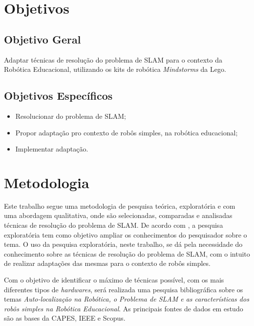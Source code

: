 	\section{Objetivos}

	\subsection{Objetivo Geral} %
	\label{sub:objetivos_gerais}
	
		Adaptar técnicas de resolução do problema de SLAM para o contexto da Robótica Educacional, utilizando os kits de robótica \textit{Mindstorms} da Lego.


	\subsection{Objetivos Específicos} %
	\label{sub:objetivos_específicos}
		 
	\begin{itemize}
		\item Resolucionar do problema de SLAM;
		\item Propor adaptação pro contexto de robôs simples, na robótica educacional;
		\item Implementar adaptação.
	\end{itemize}
	

	\section[Metodologia]{Metodologia}

Este trabalho segue uma metodologia de pesquisa teórica, exploratória e com uma abordagem qualitativa, onde são selecionadas, comparadas e analisadas técnicas de resolução do problema de SLAM. De acordo com \cite{metodologiaCientifica}, a pesquisa exploratória tem como objetivo ampliar os conhecimentos do pesquisador sobre o tema. O uso da pesquisa exploratória, neste trabalho, se dá pela necessidade do conhecimento sobre as técnicas de resolução do problema de SLAM, com o intuito de realizar adaptações das mesmas para o contexto de robôs simples.

Com o objetivo de identificar o máximo de técnicas possível, com os mais diferentes tipos de \textit{hardwares}, será realizada uma pesquisa bibliográfica sobre os temas \textit{Auto-localização na Robótica, o Problema de SLAM e as características dos robôs simples na Robótica Educacional}. As principais fontes de dados em estudo são as bases da CAPES, IEEE e Scopus.

